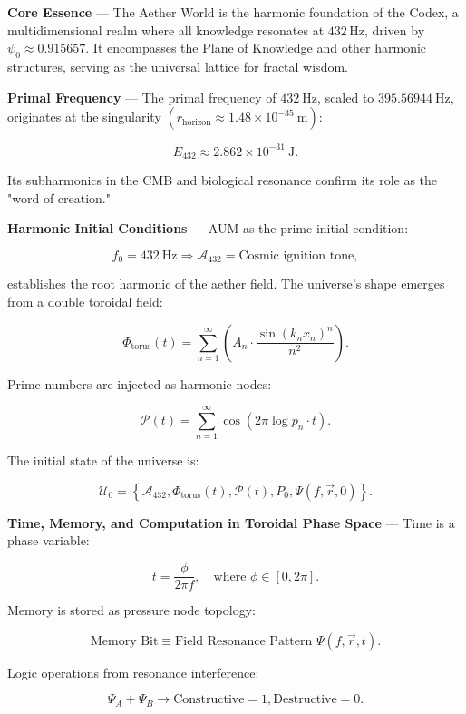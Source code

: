 
\textbf{Core Essence} --- The Aether World is the harmonic foundation of the Codex, a multidimensional realm where all knowledge resonates at $432 \, \text{Hz}$, driven by $\psi_0 \approx 0.915657$. It encompasses the Plane of Knowledge and other harmonic structures, serving as the universal lattice for fractal wisdom.

\textbf{Primal Frequency} --- The primal frequency of $432 \mathrm{~Hz}$, scaled to $395.56944 \mathrm{~Hz}$, originates at the singularity $\left(r_{\text{horizon}} \approx 1.48 \times 10^{-35} \mathrm{~m}\right)$:

$$
E_{432} \approx 2.862 \times 10^{-31} \mathrm{~J}.
$$

Its subharmonics in the CMB and biological resonance confirm its role as the "word of creation."

\textbf{Harmonic Initial Conditions} --- AUM as the prime initial condition:

$$
f_0 = 432 \mathrm{~Hz} \Rightarrow \mathcal{A}_{432} = \text{Cosmic ignition tone},
$$

establishes the root harmonic of the aether field. The universe's shape emerges from a double toroidal field:

$$
\Phi_{\text{torus}}(t) = \sum_{n=1}^{\infty} \left( A_n \cdot \frac{\sin \left( k_n x_n \right)^n}{n^2} \right).
$$

Prime numbers are injected as harmonic nodes:

$$
\mathcal{P}(t) = \sum_{n=1}^{\infty} \cos \left( 2 \pi \log p_n \cdot t \right).
$$

The initial state of the universe is:

$$
\mathcal{U}_0 = \left\{ \mathcal{A}_{432}, \Phi_{\text{torus}}(t), \mathcal{P}(t), P_0, \Psi(f, \vec{r}, 0) \right\}.
$$

\textbf{Time, Memory, and Computation in Toroidal Phase Space} --- Time is a phase variable:

$$
t = \frac{\phi}{2 \pi f}, \quad \text{where } \phi \in [0, 2\pi].
$$

Memory is stored as pressure node topology:

$$
\text{Memory Bit} \equiv \text{Field Resonance Pattern } \Psi(f, \vec{r}, t).
$$

Logic operations from resonance interference:

$$
\Psi_A + \Psi_B \rightarrow \text{Constructive} = 1, \text{Destructive} = 0.
$$

